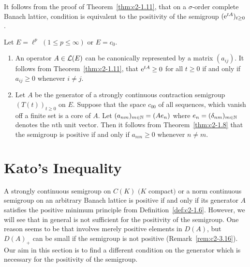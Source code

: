 \begin{remark}\label{rem:c2-1.12}
%
It follows from the proof of Theorem~\ref{thm:c2-1.11}, that on a $\sigma$-order complete Banach lattice, condition   is equivalent to the positivity of the semigroup $(\eu^{tA})_{t \geq 0}$.
\end{remark}
\begin{examples}\label{ex:c2-1.13}
%
Let $E = \ell^p$ $(1 \leq p \leq \infty)$ or $E = c_{0}$.
\begin{enumerate}[\upshape (i), wide, labelindent=.25em] %
\item \label{ex:c2-1.13-1}
An operator $A \in \mathcal{L}(E)$ can be canonically represented by a matrix $(a_{ij})$. 
It follows from Theorem~\ref{thm:c2-1.11}, that $\eu^{tA} \geq 0$ for all $t \geq 0$ if and only if\/ $a_{ij} \geq 0$ whenever $i \neq j$.
\item \label{ex:c2-1.13-2}
Let $A$ be the generator of a strongly continuous contraction semigroup $(T(t))_{t \geq 0}$ on $E$.
Suppose that the space $c_{00}$ of all sequences, which vanish off a finite set is a core of\/ $A$.
Let $(a_{nm})_{m \in \mathbb{N}} = (Ae_{n})$ where $e_{n} = (\delta_{nm})_{m \in \mathbb{N}}$ denotes the $n$th unit vector.
Then it follows from Theorem~\ref{thm:c2-1.8}   that the semigroup is positive if and only if\/ $a_{nm} \geq 0$ whenever $n \neq m$.
\end{enumerate}
\end{examples}
\section{Kato's Inequality} \label{sec:c2-2}
%
A strongly continuous semigroup on $C(K)$ $(K$ compact$)$ or a norm continuous semigroup on an arbitrary Banach lattice is positive if and only if its generator $A$ satisfies the positive minimum principle  from Definition~\ref{def:c2-1.6}.
However, we will see that in general  is not sufficient for the positivity of the semigroup.
One reason seems to be that  involves merely positive elements in $D(A)$, but $D(A)_{+}$ can be small if the semigroup is not positive (\cf Remark~\ref{rem:c2-3.16}).
Our aim in this section is to find a different condition on the generator which is necessary for the positivity of the semigroup.

